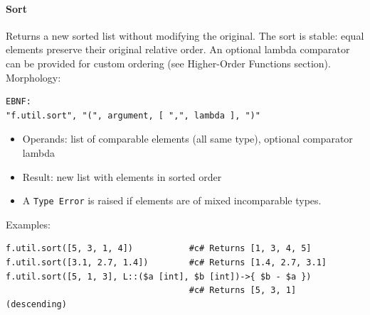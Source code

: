 \paragraph{Sort}
Returns a new sorted list without modifying the original. The sort is stable: equal elements preserve their original relative order. An optional lambda comparator can be provided for custom ordering (see Higher-Order Functions section).\\
Morphology:
\begin{verbatim}
EBNF:
"f.util.sort", "(", argument, [ ",", lambda ], ")"
\end{verbatim}
\begin{itemize}
\item Operands: list of comparable elements (all same type), optional comparator lambda
\item Result: new list with elements in sorted order
\item A \texttt{Type Error} is raised if elements are of mixed incomparable types.
\end{itemize}
Examples:
\begin{verbatim}
f.util.sort([5, 3, 1, 4])           #c# Returns [1, 3, 4, 5]
f.util.sort([3.1, 2.7, 1.4])        #c# Returns [1.4, 2.7, 3.1]
f.util.sort([5, 1, 3], L::($a [int], $b [int])->{ $b - $a })
                                    #c# Returns [5, 3, 1]  (descending)
\end{verbatim}

